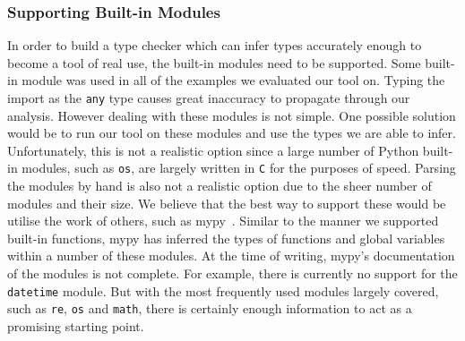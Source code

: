 \documentclass[12pt, titlepage]{article}
\begin{document}
\subsubsection*{Supporting Built-in Modules}
In order to build a type checker which can infer types accurately enough to become a tool of real use, the built-in modules need to be supported. Some built-in module was used in all of the examples we evaluated our tool on. Typing the import as the \texttt{any} type causes great inaccuracy to propagate through our analysis. However dealing with these modules is not simple. One possible solution would be to run our tool on these modules and use the types we are able to infer. Unfortunately, this is not a realistic option since a large number of Python built-in modules, such as \texttt{os}, are largely written in \texttt{C} for the purposes of speed. Parsing the modules by hand is also not a realistic option due to the sheer number of modules and their size. We believe that the best way to support these would be utilise the work of others, such as mypy~\cite{mypy}. Similar to the manner we supported built-in functions, mypy has inferred the types of functions and global variables within a number of these modules. At the time of writing, mypy's documentation of the modules is not complete. For example, there is currently no support for the \texttt{datetime} module. But with the most frequently used modules largely covered, such as \texttt{re}, \texttt{os} and \texttt{math}, there is certainly enough information to act as a promising starting point.
\end{document}

